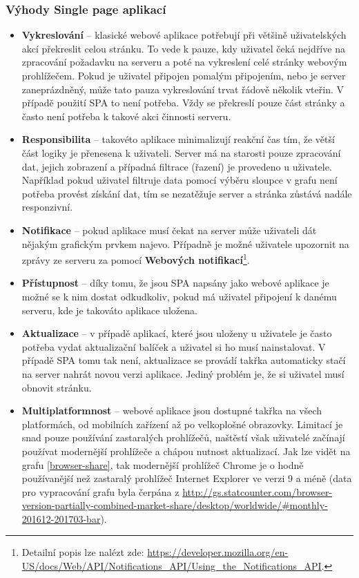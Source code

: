 \subsubsection{Výhody Single page aplikací}
\begin{itemize}
\item \textbf{Vykreslování} -- klasické webové aplikace potřebují při většině uživatelských akcí překreslit celou stránku. To vede k pauze, kdy uživatel čeká nejdříve na zpracování požadavku na serveru a poté na vykreslení celé stránky webovým prohlížečem. Pokud je uživatel připojen pomalým připojením, nebo je server zaneprázdněný, může tato pauza vykreslování trvat řádově několik vteřin. V případě použití SPA to není potřeba. Vždy se překreslí pouze část stránky a často není potřeba k takové akci činnosti serveru.
\item \textbf{Responsibilita} -- takovéto aplikace minimalizují reakční čas tím, že větší část logiky je přenesena k uživateli. Server má na starosti pouze zpracování dat, jejich zobrazení a případná filtrace (řazení) je provedeno u uživatele. Například pokud uživatel filtruje data pomocí výběru sloupce v grafu není potřeba provést získání dat, tím se nezatěžuje server a stránka zůstává nadále responzivní.
\item \textbf{Notifikace} -- pokud aplikace musí čekat na server může uživateli dát nějakým grafickým prvkem najevo. Případně je možné uživatele upozornit na zprávy ze serveru za pomocí \textbf{Webových notifikací}\footnote{Detailní popis lze nalézt zde: \url{https://developer.mozilla.org/en-US/docs/Web/API/Notifications_API/Using_the_Notifications_API}.}.
\item \textbf{Přístupnost} -- díky tomu, že jsou SPA napsány jako webové aplikace je možné se k nim dostat odkudkoliv, pokud má uživatel připojení k danému serveru, kde je takováto aplikace uložena.
\item \textbf{Aktualizace} -- v případě aplikací, které jsou uloženy u uživatele je často potřeba vydat aktualizační balíček a uživatel si ho musí nainstalovat. V případě SPA tomu tak není, aktualizace se provádí takřka automaticky stačí na server nahrát novou verzi aplikace. Jediný problém je, že si uživatel musí obnovit stránku.
\item \textbf{Multiplatformnost} -- webové aplikace jsou dostupné takřka na všech platformách, od mobilních zařízení až po velkoplošné obrazovky. Limitací je snad pouze používání zastaralých prohlížečů, naštěstí však uživatelé začínají používat modernější prohlížeče a chápou nutnost aktualizací. Jak lze vidět na grafu \ref{browser-share}, tak modernější prohlížeč Chrome je o hodně používanější než zastaralý prohlížeč Internet Explorer ve verzi 9 a méně (data pro vypracování grafu byla čerpána z \url{http://gs.statcounter.com/browser-version-partially-combined-market-share/desktop/worldwide/#monthly-201612-201703-bar}). \cite{SPA}
\end{itemize}
